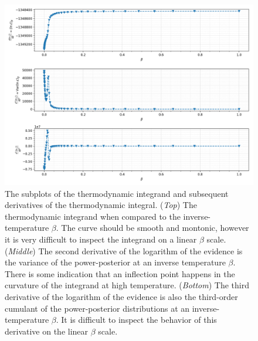 \begin{figure}[th]
\centering
\includegraphics[width=1.0\textwidth]{figs/chapter6/gooseneck_plots_linear.png}
\caption{The subplots of the thermodynamic integrand and subsequent derivatives of the thermodynamic integral. (\textit{Top}) The thermodynamic integrand when compared to the inverse-temperature $\beta$. The curve should be smooth and montonic, however it is very difficult to inspect the integrand on a linear $\beta$ scale. (\textit{Middle}) The second derivative of the logarithm of the evidence is the variance of the power-posterior at an inverse temperature $\beta$. There is some indication that an inflection point happens in the curvature of the integrand at high temperature. (\textit{Bottom}) The third derivative of the logarithm of the evidence is also the third-order cumulant of the power-posterior distributions at an inverse-temperature $\beta$. It is difficult to inspect the behavior of this derivative on the linear $\beta$ scale.}
\label{fig:gooseneck_linear}
\end{figure}

